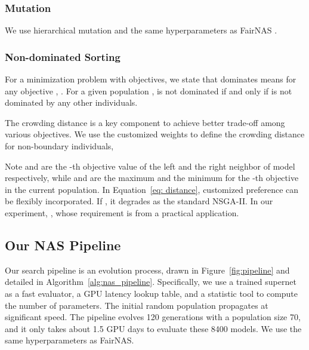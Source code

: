 \documentclass[letterpaper]{article} \usepackage{aaai20}  \usepackage{times}  \usepackage{helvet} \usepackage{courier}  \usepackage[hyphens]{url}  \usepackage{graphicx} \urlstyle{rm} \def\UrlFont{\rm}  \usepackage{graphicx}  \usepackage{amsmath}
\begin{document}
\subsubsection{Mutation}
We use hierarchical mutation and the same hyperparameters as FairNAS \cite{chu2019fairnas}.
\subsubsection{Non-dominated Sorting}
For a minimization problem with  objectives, we state that  dominates  means for any objective , . For a given population ,  is not dominated if and only if  is not dominated by any other individuals.

The crowding distance is a key component to achieve better trade-off among various objectives. We use the customized weights to define the crowding distance for non-boundary individuals,


Note  and   are the -th objective value of the left and the right neighbor of model  respectively, while  and  are the maximum and the minimum for the -th objective in the current population.
In Equation~\ref{eq: distance}, customized preference can be flexibly incorporated. If , it degrades as the standard NSGA-II. In our experiment, , whose requirement is from a practical application. 

\subsection{Our NAS Pipeline} 
Our search pipeline is an evolution process, drawn in Figure~\ref{fig:pipeline} and detailed in  Algorithm~\ref{alg:nas_pipeline}. Specifically, we use a trained supernet as a fast evaluator, a GPU latency lookup table, and a statistic tool to compute the number of parameters. The initial random population propagates at significant speed. The pipeline evolves 120 generations with a population size 70, and it only takes about 1.5 GPU days to evaluate these 8400 models. We use the same hyperparameters as FairNAS.
\end{document}
